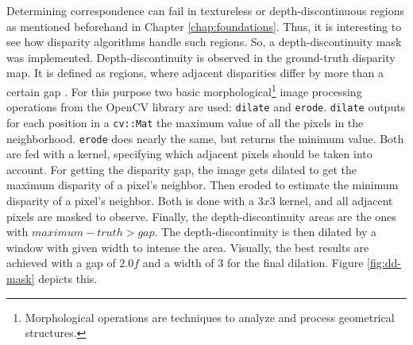 Determining correspondence can fail in textureless or depth-discontinuous regions as mentioned beforehand in Chapter \ref{chap:foundations}.
Thus, it is interesting to see how disparity algorithms handle such regions.
So, a depth-discontinuity mask was implemented.
Depth-discontinuity is observed in the ground-truth disparity map.
It is defined as regions, where adjacent disparities differ by more than a certain gap \citep{scharstein2002taxonomy, cyganek2011introduction}.
For this purpose two basic morphological\footnote{Morphological operations are techniques to analyze and process geometrical structures.} image processing operations from the OpenCV library are used: \texttt{dilate} and \texttt{erode}.
\texttt{dilate} outputs for each position in a \texttt{cv::Mat} the maximum value of all the pixels in the neighborhood.
\texttt{erode} does nearly the same, but returns the minimum value.
Both are fed with a kernel, specifying which adjacent pixels should be taken into account.
\newline\newline\noindent For getting the disparity gap, the image gets dilated to get the maximum disparity of a pixel's neighbor.
Then eroded to estimate the minimum disparity of a pixel's neighbor.
Both is done with a $3x3$ kernel, and all adjacent pixels are masked to observe.
Finally, the depth-discontinuity areas are the ones with $maximum - truth > gap$.
The depth-discontinuity is then dilated by a window with given width to intense the area.
Visually, the best results are achieved with a gap of $2.0f$ and a width of $3$ for the final dilation.
Figure \ref{fig:dd-mask} depicts this.


